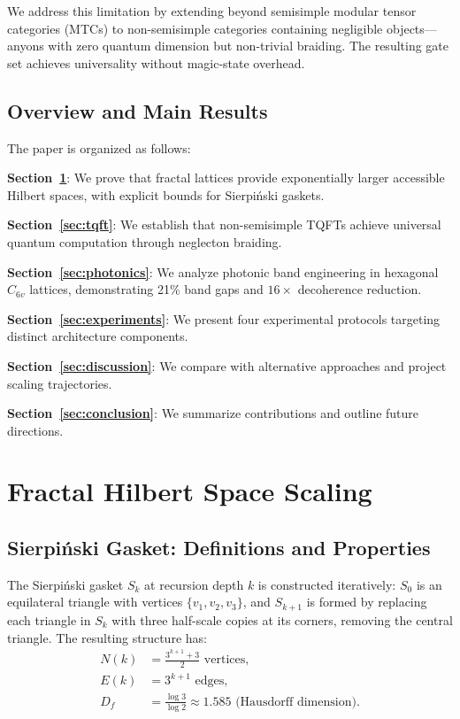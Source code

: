 \documentclass[aps,prx,twocolumn,superscriptaddress,showpacs,showkeys,floatfix]{revtex4-2}
\newcommand{\Df}{D_f}
\theoremstyle{plain}
\theoremstyle{definition}
\begin{document}
We address this limitation by extending beyond semisimple modular tensor categories (MTCs) to non-semisimple categories containing negligible objects---anyons with zero quantum dimension but non-trivial braiding. The resulting gate set achieves universality without magic-state overhead.

\subsection{Overview and Main Results}

The paper is organized as follows:

\textbf{Section~\ref{sec:hilbert_scaling}}: We prove that fractal lattices provide exponentially larger accessible Hilbert spaces, with explicit bounds for Sierpi\'{n}ski gaskets.

\textbf{Section~\ref{sec:tqft}}: We establish that non-semisimple TQFTs achieve universal quantum computation through neglecton braiding.

\textbf{Section~\ref{sec:photonics}}: We analyze photonic band engineering in hexagonal $C_{6v}$ lattices, demonstrating 21\% band gaps and $16\times$ decoherence reduction.

\textbf{Section~\ref{sec:experiments}}: We present four experimental protocols targeting distinct architecture components.

\textbf{Section~\ref{sec:discussion}}: We compare with alternative approaches and project scaling trajectories.

\textbf{Section~\ref{sec:conclusion}}: We summarize contributions and outline future directions.


\section{Fractal Hilbert Space Scaling}
\label{sec:hilbert_scaling}

\subsection{Sierpi\'{n}ski Gasket: Definitions and Properties}

The Sierpi\'{n}ski gasket $S_k$ at recursion depth $k$ is constructed iteratively: $S_0$ is an equilateral triangle with vertices $\{v_1, v_2, v_3\}$, and $S_{k+1}$ is formed by replacing each triangle in $S_k$ with three half-scale copies at its corners, removing the central triangle. The resulting structure has:
\begin{align}
N(k) &= \frac{3^{k+1} + 3}{2} \text{ vertices}, \\
E(k) &= 3^{k+1} \text{ edges}, \\
\Df &= \frac{\log 3}{\log 2} \approx 1.585 \text{ (Hausdorff dimension)}.
\end{align}
\end{document}
